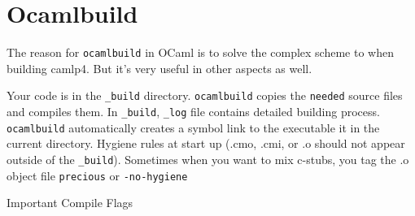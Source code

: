 
\section{Ocamlbuild}

The reason for \verb|ocamlbuild| in OCaml is to solve the complex scheme to
when building camlp4. But it's very useful in other aspects as well.

Your code is in the \verb|_build| directory. \verb|ocamlbuild| copies
the \verb|needed| source files and compiles them.  In \verb|_build|,
\verb|_log| file contains detailed building process. \verb|ocamlbuild|
automatically creates a symbol link to the executable it in the
current directory.  Hygiene rules at start up (.cmo, .cmi, or .o
should not appear outside of the \verb|_build|). Sometimes when you
want to mix c-stubs, you tag the .o object file \verb|precious| or
\verb|-no-hygiene|


Important Compile Flags 

